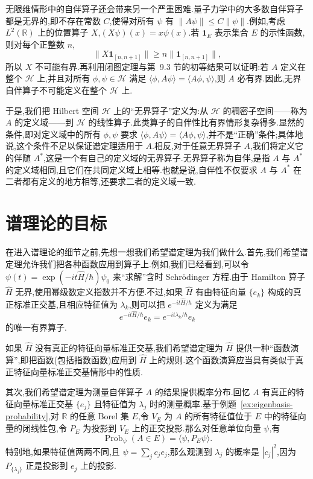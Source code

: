 无限维情形中的自伴算子还会带来另一个严重困难.量子力学中的大多数自伴算子都是无界的,即不存在常数 \(C\),使得对所有 \(\psi\) 有 \(\|A\psi\|\le C\|\psi\|\).例如,考虑 \(L^{2}(\mathbb{R})\) 上的位置算子 \(X\),\((X\psi)(x)=x\psi(x)\).若 \(\mathbf{1}_{E}\) 表示集合 \(E\) 的示性函数,则对每个正整数 \(n\),
\[
\|X\mathbf{1}_{[n,n+1]}\|
\ge n\|\mathbf{1}_{[n,n+1]}\|,
\]
所以 \(X\) 不可能有界.再利用闭图定理与第~9.3 节的初等结果可以证明:若 \(A\) 定义在整个 \(\mathcal{H}\) 上,并且对所有 \(\phi,\psi\in\mathcal{H}\) 满足 \(\langle\phi,A\psi\rangle=\langle A\phi,\psi\rangle\),则 \(A\) 必有界.因此,无界自伴算子不可能定义在整个 \(\mathcal{H}\) 上.

于是,我们把 Hilbert 空间 \(\mathcal{H}\) 上的“无界算子”定义为:从 \(\mathcal{H}\) 的稠密子空间——称为 \(A\) 的定义域——到 \(\mathcal{H}\) 的线性算子.此类算子的自伴性比有界情形复杂得多.显然的条件,即对定义域中的所有 \(\phi,\psi\) 要求 \(\langle\phi,A\psi\rangle=\langle A\phi,\psi\rangle\),并不是“正确”条件;具体地说,这个条件不足以保证谱定理适用于 \(A\).相反,对于任意无界算子 \(A\),我们将定义它的伴随 \(A^{*}\),这是一个有自己的定义域的无界算子.无界算子称为自伴,是指 \(A\) 与 \(A^{*}\) 的定义域相同,且它们在共同定义域上相等.也就是说,自伴性不仅要求 \(A\) 与 \(A^{*}\) 在二者都有定义的地方相等,还要求二者的定义域一致.

\section{谱理论的目标}\label{sec:spectral-goals}

在进入谱理论的细节之前,先想一想我们希望谱定理为我们做什么.首先,我们希望谱定理允许我们把各种函数应用到算子上.例如,我们已经看到,可以令 \(\psi(t)=\exp(-it\widehat H/\hbar)\psi_{0}\) 来“求解”含时 Schrödinger 方程.由于 Hamilton 算子 \(\widehat H\) 无界,使用幂级数定义指数并不方便.不过,如果 \(\widehat H\) 有由特征向量 \(\{e_{k}\}\) 构成的真正标准正交基,且相应特征值为 \(\lambda_{k}\),则可以把 \(e^{-it\widehat H/\hbar}\) 定义为满足
\[
e^{-it\widehat H/\hbar}e_{k}
=e^{-it\lambda_{k}/\hbar}e_{k}
\]
的唯一有界算子.

如果 \(\widehat H\) 没有真正的特征向量标准正交基,我们希望谱定理为 \(\widehat H\) 提供一种“函数演算”,即把函数(包括指数函数)应用到 \(\widehat H\) 上的规则.这个函数演算应当具有类似于真正特征向量标准正交基情形中的性质.

其次,我们希望谱定理为测量自伴算子 \(A\) 的结果提供概率分布.回忆 \(A\) 有真正的特征向量标准正交基 \(\{e_{j}\}\) 且特征值为 \(\lambda_{j}\) 时的测量概率.基于例题~\ref{ex:eigenbasis-probability},对 \(\mathbb{R}\) 的任意 Borel 集 \(E\),令 \(V_{E}\) 为 \(A\) 的所有特征值位于 \(E\) 中的特征向量的闭线性包,令 \(P_{E}\) 为投影到 \(V_{E}\) 上的正交投影.那么对任意单位向量 \(\psi\),有
\begin{equation}
\operatorname{Prob}_{\psi}(A\in E)=\langle\psi,P_{E}\psi\rangle.
\label{eq:spectral-measurement-probability}
\end{equation}
特别地,如果特征值两两不同,且 \(\psi=\sum_{j}c_{j}e_{j}\),那么观测到 \(\lambda_{j}\) 的概率是 \(|c_{j}|^{2}\),因为 \(P_{\{\lambda_{j}\}}\) 正是投影到 \(e_{j}\) 上的投影.

